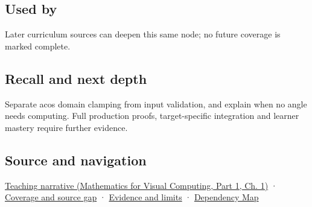 \subsection{Used by}\label{appendix-e569e60e18e6-used-by}

\hypertarget{appendix-e569e60e18e6-used-by}{}

Later curriculum sources can deepen this same node; no future coverage is marked complete.

\subsection{Recall and next depth}\label{appendix-e569e60e18e6-recall-and-next-depth}

\hypertarget{appendix-e569e60e18e6-recall-and-next-depth}{}

Separate acos domain clamping from input validation, and explain when no angle needs computing. Full production proofs, target-specific integration and learner mastery require further evidence.

\subsection{Source and navigation}\label{appendix-e569e60e18e6-source-and-navigation}

\hypertarget{appendix-e569e60e18e6-source-and-navigation}{}

\href{../02-Mathematics-for-Visual-Computing-P01/main.pdf\#01-foundations-i-ch017-an-angle-is-a-question-with-a-domain}{Teaching narrative (Mathematics for Visual Computing, Part 1, Ch. 1)} · \hyperref[appendix-fd090d982a15-phase-6---parts-501-600]{Coverage and source gap} · \hyperref[appendix-a103e7846d21-phase-6---source-analysis-and-verification]{Evidence and limits} · \hyperref[appendix-4ad47bdd269a]{Dependency Map}
